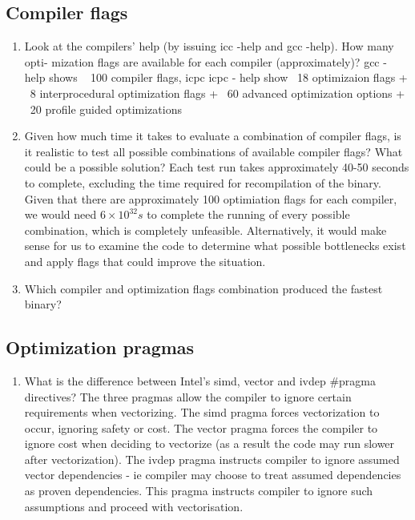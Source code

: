 \documentclass{article}
\begin{document}
\subsection{Compiler flags}
\begin{enumerate}
\item{Look at the compilers’ help (by issuing icc -help and gcc -help). How many opti-
mization flags are available for each compiler (approximately)?}
gcc - help shows ~ 100 compiler flags, icpc
icpc - help show ~18 optimizaion flags + ~8 interprocedural optimization flags + ~60 advanced optimization options + ~20 profile guided optimizations
\item{Given how much time it takes to evaluate a combination of compiler flags, is it realistic to test all possible combinations of available compiler flags? What could be a possible solution?
} Each test run takes approximately 40-50 seconds to complete, excluding the time required for recompilation of the binary. Given that there are approximately 100 optimiation flags  for each compiler, we would need $6\times10^{32}s$ to complete the running of every possible combination, which is completely unfeasible. Alternatively, it would make sense for us to examine the code to determine what possible bottlenecks exist and apply flags that could improve the situation. 
\item{Which compiler and optimization flags combination produced the fastest binary?}
\end{enumerate}

\subsection{Optimization pragmas}
\begin{enumerate}
\item{What is the difference between Intel’s simd, vector and ivdep #pragma directives?}
The three pragmas allow the compiler to ignore certain requirements when vectorizing. The simd pragma forces vectorization to occur, ignoring safety or cost. The vector pragma forces the compiler to ignore cost when deciding to vectorize (as a result the code may run slower after vectorization). The ivdep pragma instructs compiler to ignore assumed vector dependencies - ie compiler may choose to treat assumed dependencies as proven dependencies. This pragma instructs compiler to ignore such assumptions and proceed with vectorisation.

\end{enumerate}
\end{document}
